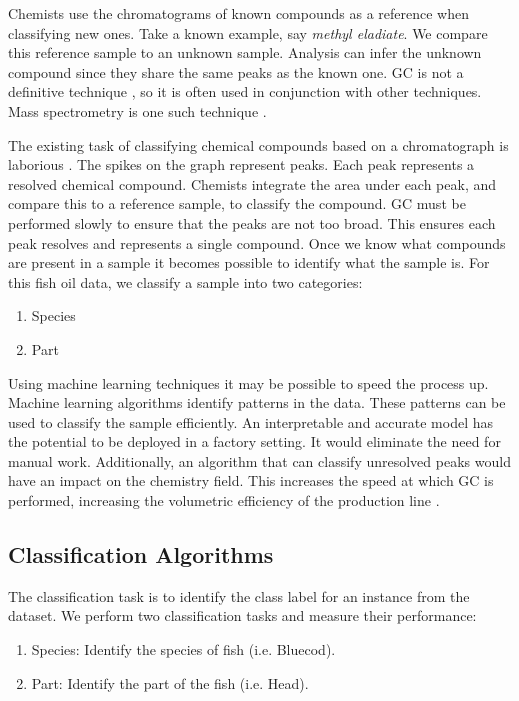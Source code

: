 \documentclass[runningheads]{llncs}
\begin{document}
Chemists use the chromatograms of known compounds as a reference when classifying new ones.
Take a known example, say \emph{methyl eladiate}.
We compare this reference sample to an unknown sample.
Analysis can infer the unknown compound since they share the same peaks as the known one.
GC is not a definitive technique \cite{khan2013gas}, so it is often used in conjunction with other techniques.
Mass spectrometry is one such technique \cite{restek2018high}.

The existing task of classifying chemical compounds based on a chromatograph is laborious \cite{eder1995gas,restek2018high}.
The spikes on the graph represent peaks.
Each peak represents a resolved chemical compound.
Chemists integrate the area under each peak, and compare this to a reference sample, to classify the compound.
GC must be performed slowly to ensure that the peaks are not too broad.
This ensures each peak resolves and represents a single compound.
Once we know what compounds are present in a sample it becomes possible to identify what the sample is.
For this fish oil data, we classify a sample into two categories:

\begin{enumerate}
  \item Species
  \item Part
\end{enumerate}

Using machine learning techniques it may be possible to speed the process up.
Machine learning algorithms identify patterns in the data.
These patterns can be used to classify the sample efficiently.
An interpretable and accurate model has the potential to be deployed in a factory setting.
It would eliminate the need for manual work.
Additionally, an algorithm that can classify unresolved peaks would have an impact on the chemistry field.
This increases the speed at which GC is performed, increasing the volumetric efficiency of the production line \cite{musk2020battery}.

\subsection{Classification Algorithms}

The classification task is to identify the class label for an instance from the dataset.
We perform two classification tasks and measure their performance:

\begin{enumerate}
  \item Species: Identify the species of fish (i.e. Bluecod).
  \item Part: Identify the part of the fish (i.e. Head).
\end{enumerate}
\end{document}
